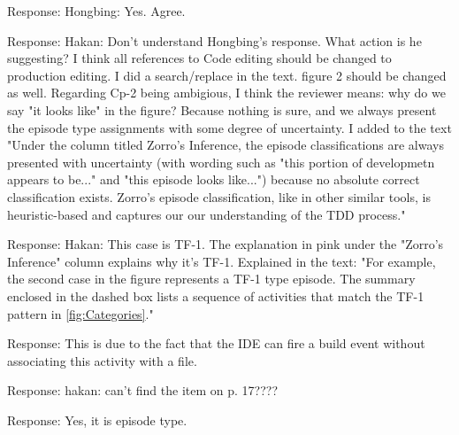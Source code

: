 \documentclass[11pt]{article}
\begin{document}

\noindent Response: Hongbing: Yes. Agree.

\noindent Response: Hakan: Don't understand Hongbing's response. What action is he suggesting? I think all references to Code editing should be changed to production editing. I did a search/replace in the text. figure 2 should be changed as well. Regarding Cp-2 being ambigious, I think the reviewer means: why do we say "it looks like" in the figure? Because nothing is sure, and we always present the episode type assignments with some degree of uncertainty. I added to the text "Under the column titled Zorro's Inference, the episode classifications are always 
presented with uncertainty (with wording such as "this portion of developmetn appears to be..." and "this episode looks like...") because no absolute correct classification exists. Zorro's episode classification, like in other similar tools, is heuristic-based and captures our our understanding of the TDD process."


\noindent Response: Hakan: This case is TF-1. The explanation in pink under the "Zorro's Inference" column explains why it's TF-1. Explained in the text: "For example, the second case in the figure represents a TF-1 type episode. The summary enclosed in 
the dashed box lists a sequence of activities that match the TF-1 pattern in \ref{fig:Categories}."


\noindent Response: This is due to the fact that the IDE can fire a build event without associating this activity with a file. 

\noindent Response: hakan: can't find the item on p. 17????


\noindent Response: Yes, it is episode type. 

\end{document}
